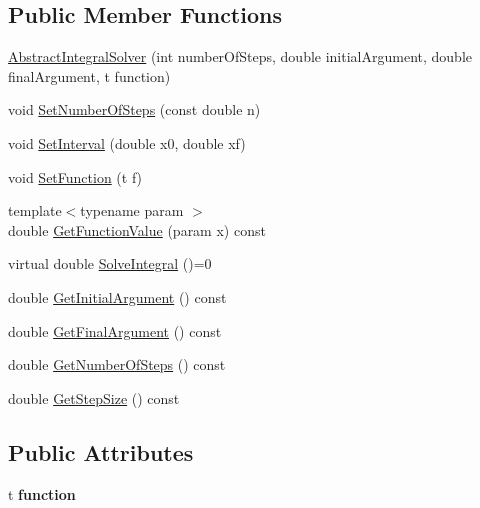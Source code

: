 \subsection*{Public Member Functions}
\begin{DoxyCompactItemize}
\item 
\hyperlink{class_abstract_integral_solver_a44d64706b428c7b0bd4c9779c4d32b6f}{Abstract\+Integral\+Solver} (int number\+Of\+Steps, double initial\+Argument, double final\+Argument, t function)
\item 
void \hyperlink{class_abstract_integral_solver_ab74cb9894daf3bcc97e14158a6087d99}{Set\+Number\+Of\+Steps} (const double n)
\item 
void \hyperlink{class_abstract_integral_solver_a891baae0103a8b488cf6cd007c109844}{Set\+Interval} (double x0, double xf)
\item 
void \hyperlink{class_abstract_integral_solver_adfb6eb8d70ebaf103e25ce468ac38b40}{Set\+Function} (t f)
\item 
{\footnotesize template$<$typename param $>$ }\\double \hyperlink{class_abstract_integral_solver_ae2f3d78fabe31ebe3b328fb6c52a2209}{Get\+Function\+Value} (param x) const
\item 
virtual double \hyperlink{class_abstract_integral_solver_ad87cb44c5ef3122bc95be48f473ba399}{Solve\+Integral} ()=0
\item 
double \hyperlink{class_abstract_integral_solver_adb8ef30d8231a173ee85e91155829daa}{Get\+Initial\+Argument} () const
\item 
double \hyperlink{class_abstract_integral_solver_a30f25ec2dff6d5881875952bec1d1774}{Get\+Final\+Argument} () const
\item 
double \hyperlink{class_abstract_integral_solver_a90148ecbeb6396638c428a319a7031dd}{Get\+Number\+Of\+Steps} () const
\item 
double \hyperlink{class_abstract_integral_solver_a0220c77810a813699748b875627da1a7}{Get\+Step\+Size} () const
\end{DoxyCompactItemize}
\subsection*{Public Attributes}
\begin{DoxyCompactItemize}
\item 
\mbox{\label{class_abstract_integral_solver_ae31c391a21c6057e313295ad04de8a69}} 
t {\bfseries function}
\end{DoxyCompactItemize}


